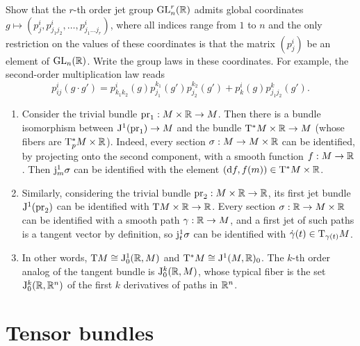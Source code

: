 \begin{xca}
    Show that the $r$-th order jet group $\operatorname{GL}^r_n(\mathbb{R})$ admits global coordinates $g\mapsto (p^i_j,p^i_{j_1j_2},\ldots,p^i_{j_1\ldots j_r})$, where all indices range from $1$ to $n$ and the only restriction on the values of these coordinates is that the matrix $(p^i_j)$ be an element of $\operatorname{GL}_n(\mathbb{R})$. Write the group laws in these coordinates. For example, the second-order multiplication law reads 
    \[p^i_{ij}(g\cdot g')=p^i_{k_1k_2}(g)p^{k_1}_{j_1}(g')p^{k_2}_{j_2}(g')+p^{i}_{k}(g)p^k_{j_1j_2}(g').\]
\end{xca}

\begin{example}
    \begin{enumerate}
        \item Consider the trivial bundle $\operatorname{pr}_1:M\times\mathbb{R}\to M$. Then there is a bundle isomorphism between $\mathrm{J}^1(\operatorname{pr}_1)\to M$ and the bundle $\mathrm{T}^\ast M\times \mathbb{R}\to M$ (whose fibers are $\mathrm{T}^\ast_pM\times\mathbb{R}$). Indeed, every section $\sigma:M\to M\times\mathbb{R}$ can be identified, by projecting onto the second component, with a smooth function $f:M\to \mathbb{R}$. Then $\mathrm{j}^1_m\sigma$ can be identified with the element $({\mathrm{d}} f,f(m))\in \mathrm{T}^\ast M\times \mathbb{R}$.
        
        \item Similarly, considering the trivial bundle $\operatorname{pr}_2:M\times \mathbb{R}\to \mathbb{R}$, its first jet bundle $\mathrm{J}^1(\operatorname{pr}_2)$ can be identified with $\mathrm{T} M\times \mathbb{R}\to \mathbb{R}$. Every section $\sigma:\mathbb{R}\to M\times\mathbb{R}$ can be identified with a smooth path $\gamma:\mathbb{R}\to M$, and a first jet of such paths is a tangent vector by definition, so $\mathrm{j}^1_t\sigma$ can be identified with $\dot\gamma(t)\in \mathrm{T}_{\gamma(t)}M$.

        \item In other words, $\mathrm{T} M\cong \mathrm{J}^1_0(\mathbb{R},M)$ and $\mathrm{T}^\ast M\cong \mathrm{J}^1(M,\mathbb{R})_0$. The $k$-th order analog of the tangent bundle is $\mathrm{J}^k_0(\mathbb{R},M)$, whose typical fiber is the set $\mathrm{J}_0^k(\mathbb{R},\mathbb{R}^n)$ of the first $k$ derivatives of paths in $\mathbb{R}^n$.
    \end{enumerate}
\end{example}







\section{Tensor bundles}



